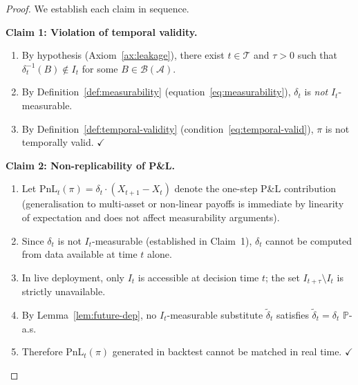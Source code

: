 \documentclass[12pt,openany]{book}
\newcommand{\calI}{\mathcal{I}}
\newcommand{\calA}{\mathcal{A}}
\numberwithin{equation}{chapter}
\theoremstyle{plain}
\theoremstyle{definition}
\theoremstyle{remark}
\numberwithin{equation}{chapter}
\theoremstyle{plain}
\def\calI{I}%
\begin{document}
\begin{proof}
We establish each claim in sequence.

\medskip
\noindent\textbf{Claim 1: Violation of temporal validity.}
\begin{enumerate}
  \item By hypothesis (Axiom~\ref{ax:leakage}), there exist
        $t \in \mathcal{T}$ and $\tau > 0$ such that
        $\delta_t^{-1}(B) \notin \calI_t$ for some
        $B \in \mathcal{B}(\calA)$.
  \item By Definition~\ref{def:measurability}
        (equation~\eqref{eq:measurability}), $\delta_t$ is
        \emph{not} $\calI_t$-measurable.
  \item By Definition~\ref{def:temporal-validity}
        (condition~\eqref{eq:temporal-valid}), $\pi$ is not
        temporally valid. $\checkmark$
\end{enumerate}

\medskip
\noindent\textbf{Claim 2: Non-replicability of P\&L.}
\begin{enumerate}
  \item Let $\mathrm{PnL}_t(\pi) = \delta_t \cdot (X_{t+1} - X_t)$
        denote the one-step P\&L contribution (generalisation to
        multi-asset or non-linear payoffs is immediate by linearity
        of expectation and does not affect measurability arguments).
  \item Since $\delta_t$ is not $\calI_t$-measurable (established in
        Claim~1), $\delta_t$ cannot be computed from data available at
        time $t$ alone.
  \item In live deployment, only $\calI_t$ is accessible at decision
        time $t$; the set $\calI_{t+\tau} \setminus \calI_t$ is
        strictly unavailable.
  \item By Lemma~\ref{lem:future-dep}, no $\calI_t$-measurable
        substitute $\tilde{\delta}_t$ satisfies
        $\tilde{\delta}_t = \delta_t$ $\mathbb{P}$-a.s.
  \item Therefore $\mathrm{PnL}_t(\pi)$ generated in backtest
        cannot be matched in real time. $\checkmark$
\end{enumerate}


\end{proof}
\end{document}
